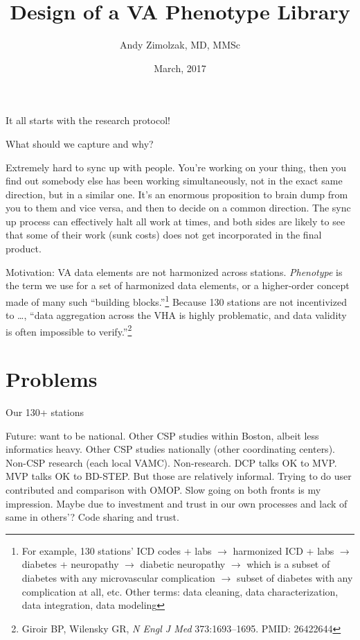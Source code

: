 \documentclass{tufte-handout}
\title{Design of a VA Phenotype Library}
\author{Andy Zimolzak, MD, MMSc}
\date{March, 2017}
\begin{document}
\maketitle

It all starts with the research protocol!

What should we capture and why?

Extremely hard to sync up with people. You're working on your thing,
then you find out somebody else has been working simultaneously, not
in the exact same direction, but in a similar one. It's an enormous
proposition to brain dump from you to them and vice versa, and then to
decide on a common direction. The sync up process can effectively halt
all work at times, and both sides are likely to see that some of their
work (sunk costs) does not get incorporated in the final product.

Motivation: VA data elements are not harmonized across stations.
\emph{Phenotype} is the term we use for a set of harmonized data
elements, or a higher-order concept made of many such ``building
blocks.''\footnote{For example, 130 stations' ICD codes + labs $\to$
  harmonized ICD + labs $\to$ diabetes + neuropathy $\to$ diabetic
  neuropathy $\to$ which is a subset of diabetes with any
  microvascular complication $\to$ subset of diabetes with any
  complication at all, etc. Other terms: data cleaning, data
  characterization, data integration, data modeling} Because 130
stations are not incentivized to \ldots{}, %
``data aggregation across the
VHA is highly problematic, and data validity is often impossible to
verify.''\footnote{Giroir BP, Wilensky GR, \emph{N Engl J Med}
  373:1693--1695. PMID: 26422644}

\section{Problems}

Our 130+ stations %

Future: want to be national. Other CSP studies within Boston, albeit
less informatics heavy. Other CSP studies nationally (other
coordinating centers). Non-CSP research (each local VAMC).
Non-research. DCP talks OK to MVP. MVP talks OK to BD-STEP. But those
are relatively informal. Trying to do user contributed and comparison
with OMOP. Slow going on both fronts is my impression. Maybe due to
investment and trust in our own processes and lack of same in others'?
Code sharing and trust.
\end{document}
